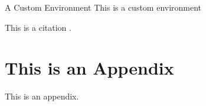 \documentclass[12pt]{notex}
\begin{document}
\begin{corollary}
    \lipsum[4]
\end{corollary}

\begin{proposition}
    \lipsum[5]
\end{proposition}

\begin{statement*} %
    \lipsum[6]
\end{statement*}

\begin{conjecture*}
    \lipsum[7]
\end{conjecture*}

\begin{definition**} %
    \lipsum[8]
\end{definition**}

\begin{problem**}
    \lipsum[9]
\end{problem**}

\begin{question}
    \lipsum[10]
\end{question}

\begin{claim}
    \lipsum[11]
\end{claim}

\begin{fact}
    \lipsum[12]
\end{fact}

\begin{remark}
    \lipsum[13]
\end{remark}

\begin{exercise}
    \lipsum[14]
\end{exercise}

\begin{solution}
    \lipsum[15]
\end{solution}

\begin{example}
    \lipsum[16]
\end{example}

\begin{custom}{A Custom Environment}
    This is a custom environment
\end{custom}

This is a citation \cite{placeholderref}.




\appendix

\section{This is an Appendix}

This is an appendix.
\end{document}
